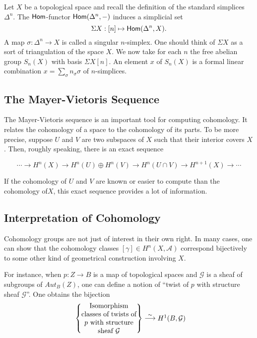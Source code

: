 Let $X$ be a topological space and recall the definition of the standard simplices $\Delta^n$. The $\mathsf{Hom}$-functor $\mathsf{Hom}(\Delta^n, -)$ induces a simplicial set
\[\Sigma X: [n] \mapsto \mathsf{Hom}(\Delta^n, X).\]
A map $\sigma : \Delta^n \to X$ is called a singular $n$-simplex. One should think of $\Sigma X$ as a sort of triangulation of the space $X$. We now take for each $n$ the free abelian group $S_n(X)$ with basis $\Sigma X[n]$. An element $x$ of $S_n(X)$ is a formal linear combination $x = \sum_\sigma n_\sigma \sigma$ of $n$-simplices. 

%
%
\subsection{The Mayer-Vietoris Sequence}

The Mayer-Vietoris sequence is an important tool for computing cohomology. It relates the cohomology of a space to the cohomology of its parts. To be more precise, suppose $U$ and $V$ are two subspaces of $X$ such that their interior covers $X$. Then, roughly speaking, there is an exact sequence

\[
\cdots \to H^n(X) \to H^n(U) \oplus  H^n(V) \to H^n(U\cap V) \to H^{n+1}(X) \to \cdots
\]

If the cohomology of $U$ and $V$ are known or easier to compute than the cohomology of$X$, this exact sequence provides a lot of information.

\subsection{Interpretation of Cohomology}
Cohomology groups are not just of interest in their own right. In many cases, one can show that the cohomology classes $[\gamma] \in H^n(X, \mathcal{A})$ correspond bijectively to some other kind of geometrical construction involving $X$.

For instance, when $p:Z \to B$ is a map of topological spaces and $\mathcal{G}$  is a sheaf of subgroups of $Aut_B(Z)$, one can define a notion of “twist of $p$ with structure sheaf $\mathcal{G}$”. One obtains the bijection
\begin{align}
            \left\{ \parbox[c]{1.1in}{\centering
                       Isomorphism classes of twists of $p$
                       with structure sheaf $\mathcal{G}$}
            \right\}
            \stackrel{\sim}{\longrightarrow}
            \parbox[c]{0.5in}{\centering
                       $H^1(B, \mathcal{G})$}
\end{align}

